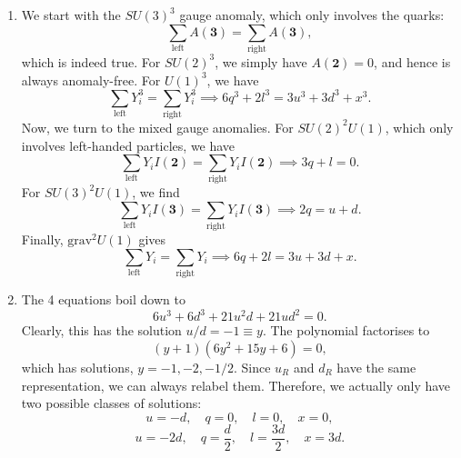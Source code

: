 \begin{solution}
    \begin{enumerate}[label=\roman*)]
    \item We start with the $SU(3)^3$ gauge anomaly, which only involves the quarks:
    \begin{equation}
        \sum_\text{left} A(\mathbf{3}) = \sum_\text{right} A(\mathbf{3}),
    \end{equation}
    which is indeed true. For $SU(2)^3$, we simply have $A(\mathbf{2}) = 0$, and hence is always anomaly-free. For $U(1)^3$, we have
    \begin{equation}
        \sum_\text{left}Y_i^3 = \sum_\text{right}Y_i^3 \implies 6q^3 + 2l^3 = 3u^3+ 3d^3+x^3.
    \end{equation}
    Now, we turn to the mixed gauge anomalies. For $SU(2)^2U(1)$, which only involves left-handed particles, we have
    \begin{equation}
        \sum_\text{left}Y_iI(\mathbf{2}) = \sum_\text{right}Y_iI(\mathbf{2}) \implies 3q + l = 0.
    \end{equation}
    For $SU(3)^2U(1)$, we find
    \begin{equation}
        \sum_\text{left}Y_iI(\mathbf{3}) = \sum_\text{right}Y_iI(\mathbf{3}) \implies 2q = u+d.
    \end{equation}
    Finally, $\text{grav}^2U(1)$ gives
    \begin{equation}
        \sum_\text{left} Y_i = \sum_\text{right} Y_i \implies 6q + 2l = 3u + 3d + x.
    \end{equation}
    \item The 4 equations boil down to
    \begin{equation}
        6u^3 +6d^3 + 21u^2d+21ud^2 = 0.
    \end{equation}
    Clearly, this has the solution $u/d = -1 \equiv y$. The polynomial factorises to
    \begin{equation}
        (y+1)(6y^2+15y+6) = 0,
    \end{equation}
    which has solutions, $y= -1, -2, -1/2$. Since $u_R$ and $d_R$ have the same representation, we can always relabel them. Therefore, we actually only have two possible classes of solutions:
    \begin{equation}
        u=-d, \quad q=0,\quad l=0,\quad x=0,
    \end{equation}
    \begin{equation}
        u=-2d,\quad q=\frac{d}{2},\quad l=\frac{3d}{2},\quad x =3d.
    \end{equation}
    \end{enumerate}
\end{solution}

